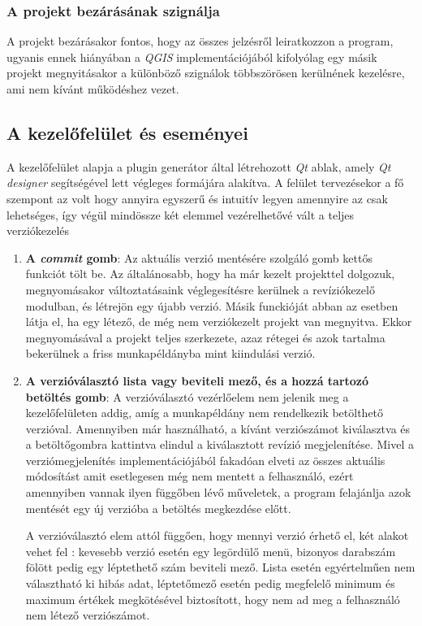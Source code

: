 \begin{list}{}{}
\subsubsection{A projekt bezárásának szignálja}
A projekt bezárásakor fontos, hogy az összes jelzésről leiratkozzon a program, ugyanis ennek hiányában a \emph{QGIS} implementációjából kifolyólag egy másik projekt megnyitásakor a különböző szignálok többszörösen kerülnének kezelésre, ami nem kívánt működéshez vezet.
\end{list}
\subsection{A kezelőfelület és eseményei}
A kezelőfelület alapja a plugin generátor által létrehozott \emph{Qt} ablak, amely \emph{Qt designer} segítségével lett végleges formájára alakítva. A felület tervezésekor a fő szempont az volt hogy annyira egyszerű és intuitív legyen amennyire az csak lehetséges, így végül mindössze két elemmel vezérelhetővé vált a teljes verziókezelés
\begin{enumerate}
	\item \textbf{A \emph{commit} gomb}: Az aktuális verzió mentésére szolgáló gomb kettős funkciót tölt be. Az általánosabb, hogy ha már kezelt projekttel dolgozuk, megnyomásakor változtatásaink véglegesítésre kerülnek a revíziókezelő modulban, és létrejön egy újabb verzió. Másik funckióját abban az esetben látja el, ha egy létező, de még nem verziókezelt projekt van megnyitva. Ekkor megnyomásával a projekt teljes szerkezete, azaz rétegei és azok tartalma bekerülnek a friss munkapéldányba mint kiindulási verzió.
	\item \textbf{A verzióválasztó lista vagy beviteli mező, és a hozzá tartozó betöltés gomb}: A verzióválasztó vezérlőelem nem jelenik meg a kezelőfelületen addig, amíg a munkapéldány nem rendelkezik betölthető verzióval. Amennyiben már használható, a kívánt verziószámot kiválasztva és a betöltőgombra kattintva elindul a kiválasztott revízió megjelenítése. Mivel a verziómegjelenítés implementációjából fakadóan elveti az összes aktuális módosítást amit esetlegesen még nem mentett a felhasználó, ezért amennyiben vannak ilyen függőben lévő műveletek, a program felajánlja azok mentését egy új verzióba a betöltés megkezdése előtt.
	\begin{note}
	A verzióválasztó elem attól függően, hogy mennyi verzió érhető el, két alakot vehet fel : kevesebb verzió esetén egy legördülő menü, bizonyos darabszám fölött pedig egy léptethető szám beviteli mező. Lista esetén egyértelműen nem választható ki hibás adat, léptetőmező esetén pedig megfelelő minimum és maximum értékek megkötésével biztosított, hogy nem ad meg a felhasználó nem létező verziószámot.
	\end{note}
\end{enumerate}

